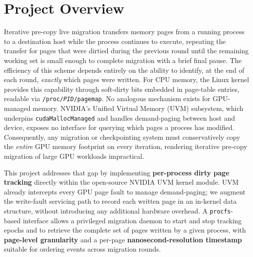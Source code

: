 \section*{Project Overview}

Iterative pre-copy live migration transfers memory pages from a running process
to a destination host while the process continues to execute, repeating the
transfer for pages that were dirtied during the previous round until the
remaining working set is small enough to complete migration with a brief final
pause.
The efficiency of this scheme depends entirely on the ability to identify,
at the end of each round, \emph{exactly} which pages were written.
For CPU memory, the Linux kernel provides this capability through soft-dirty
bits embedded in page-table entries, readable via \texttt{/proc/\textit{PID}/pagemap}.
No analogous mechanism exists for GPU-managed memory.
NVIDIA's Unified Virtual Memory (UVM) subsystem, which underpins \texttt{cudaMallocManaged}
and handles demand-paging between host and device, exposes no interface for
querying which pages a process has modified. Consequently, any migration or checkpointing system must conservatively copy the
\emph{entire} GPU memory footprint on every iteration, rendering iterative
pre-copy migration of large GPU workloads impractical.

This project addresses that gap by implementing \textbf{per-process dirty page
tracking} directly within the open-source NVIDIA UVM kernel module.
UVM already intercepts every GPU page fault to manage demand-paging; we augment
the write-fault servicing path to record each written page in an in-kernel
data structure, without introducing any additional hardware overhead.
A \texttt{procfs}-based interface allows a privileged migration daemon to
start and stop tracking epochs and to retrieve the complete set of pages written
by a given process, with \textbf{page-level granularity} and a per-page
\textbf{nanosecond-resolution timestamp} suitable for ordering events across
migration rounds.
